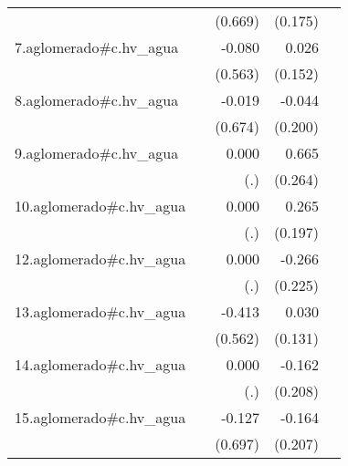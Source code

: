 {\begin{longtable}{l*{4}{D{.}{.}{-1}}}
            &                     &     (0.669)         &     (0.175)         &                     \\
\addlinespace
7.aglomerado#c.hv\_agua&                     &      -0.080         &       0.026         &                     \\
            &                     &     (0.563)         &     (0.152)         &                     \\
\addlinespace
8.aglomerado#c.hv\_agua&                     &      -0.019         &      -0.044         &                     \\
            &                     &     (0.674)         &     (0.200)         &                     \\
\addlinespace
9.aglomerado#c.hv\_agua&                     &       0.000         &       0.665\sym{*}  &                     \\
            &                     &         (.)         &     (0.264)         &                     \\
\addlinespace
10.aglomerado#c.hv\_agua&                     &       0.000         &       0.265         &                     \\
            &                     &         (.)         &     (0.197)         &                     \\
\addlinespace
12.aglomerado#c.hv\_agua&                     &       0.000         &      -0.266         &                     \\
            &                     &         (.)         &     (0.225)         &                     \\
\addlinespace
13.aglomerado#c.hv\_agua&                     &      -0.413         &       0.030         &                     \\
            &                     &     (0.562)         &     (0.131)         &                     \\
\addlinespace
14.aglomerado#c.hv\_agua&                     &       0.000         &      -0.162         &                     \\
            &                     &         (.)         &     (0.208)         &                     \\
\addlinespace
15.aglomerado#c.hv\_agua&                     &      -0.127         &      -0.164         &                     \\
            &                     &     (0.697)         &     (0.207)         &                     \\

\end{longtable}}
